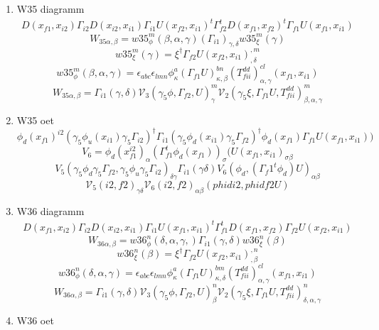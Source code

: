 \documentclass{article}[12pt]
\begin{document}
\begin{itemize}
\begin{enumerate}
\item W35 diagramm
\begin{eqnarray}
D(x_{f1},x_{i2})\Gamma_{i2}D(x_{i2},x_{i1})\Gamma_{i1}U(x_{f2},x_{i1})^t\Gamma_{f2}^tD(x_{f1},x_{f2})^t\Gamma_{f1}U(x_{f1},x_{i1})
\end{eqnarray}
$$
W_{35\alpha,\beta}=w35_{\phi}^{m}\left(\beta,\alpha,\gamma\right)\left(\Gamma_{i1}\right)_{\gamma,\delta}w35_{\xi}^{m}\left(\gamma\right)
$$
$$
w35_{\xi}^{m}\left(\gamma\right)=\xi^{\dagger}\Gamma_{f2}U\left(x_{f2},x_{i1}\right)^{,m}_{,\delta}
$$
$$
w35_{\phi}^{m}\left(\beta,\alpha,\gamma\right)=\epsilon_{abc}\epsilon_{lmn}\phi^{a}_{\kappa}\left(\Gamma_{f1}U\right)^{bn}_{\kappa,\beta}\left(T_{fii}^{dd}\right)^{cl}_{\alpha,\gamma}\left(x_{f1},x_{i1}\right)
$$
$$
W_{35\alpha,\beta}=\Gamma_{i1}\left(\gamma,\delta\right){\mathcal V}_{3}\left(\gamma_5\phi,\Gamma_{f2},U\right)^{m}_{\gamma}{\mathcal V}_{2}\left(\gamma_5\xi,\Gamma_{f1}U,T_{fii}^{dd}\right)^{m}_{\beta,\alpha,\gamma}
$$
\item W35 oet
$$
\phi_d(x_{f1})^{i2}(\gamma_5\phi_u(x_{i1})\gamma_5\Gamma_{i2})^\dagger
\Gamma_{i1}(\gamma_5\phi_d(x_{i1})\gamma_5\Gamma_{f2})^\dagger \phi_d(x_{f1})\Gamma_{f1}U(x_{f1},x_{i1}))
$$
$$
V_6=\phi_d(x_{f1}^{i2})_{\alpha}(\Gamma_{f1}^t\phi_d(x_{f1}))_{\sigma}(U(x_{f1},x_{i1})_{\sigma\beta}
$$
$$
V_5(\gamma_5\phi_d\gamma_5\Gamma_{f2},\gamma_5\phi_u\gamma_5\Gamma_{i2})_{\delta\gamma}\Gamma_{i1}(\gamma\delta)V_6(\phi_d, (\Gamma_f1^t\phi_d)U)_{\alpha\beta}
$$
$$
{\mathcal V}_5(i2,f2)_{\gamma\delta}{\mathcal V}_6(i2,f2)_{\alpha\beta}(phidi2,phidf2U)
$$
\item W36 diagramm
\begin{eqnarray}
D(x_{f1},x_{i2})\Gamma_{i2}D(x_{i2},x_{i1})\Gamma_{i1}U(x_{f1},x_{i1})^t\Gamma_{f1}^tD(x_{f1},x_{f2})\Gamma_{f2}U(x_{f2},x_{i1})
\end{eqnarray}
$$
W_{36\alpha,\beta}=w36_{\phi}^{n}\left(\delta,\alpha,\gamma,\right)\Gamma_{i1}\left(\gamma,\delta\right)w36_{\xi}^{n}\left(\beta\right)
$$
$$
w36_{\xi}^{n}\left(\beta\right)=\xi^{\dagger}\Gamma_{f2}U\left(x_{f2},x_{i1}\right)^{,n}_{,\beta}
$$
$$
w36_{\phi}^{n}\left(\delta,\alpha,\gamma\right)=\epsilon_{abc}\epsilon_{lmn}\phi^{a}_{\kappa}\left(\Gamma_{f1}U\right)^{bm}_{\kappa,\delta}\left(T_{fii}^{dd}\right)^{cl}_{\alpha,\gamma}\left(x_{f1},x_{i1}\right)
$$
$$
W_{36\alpha,\beta}=\Gamma_{i1}\left(\gamma,\delta\right){\mathcal V}_{3}\left(\gamma_5\phi,\Gamma_{f2},U\right)^{n}_{\beta}{\mathcal V}_{2}\left(\gamma_5\xi,\Gamma_{f1}U,T_{fii}^{dd}\right)^{n}_{\delta,\alpha,\gamma}
$$
\item W36 oet

\end{enumerate}
\end{itemize}
\end{document}
